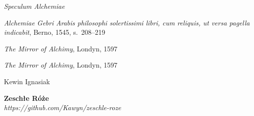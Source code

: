 \thispagestyle{empty}

\begin{flushleft}


\vspace{0.3em}

\textit{Speculum Alchemiae}

\vspace{1.5em}


\vspace{0.3em}


\textit{Alchemiae Gebri Arabis philosophi solertissimi libri, cum reliquis, ut versa pagella indicabit}, Berno, 1545, s.~208--219

\vspace{0.5em}

\textit{The Mirror of Alchimy}, Londyn, 1597

\vspace{1.5em}


\vspace{0.3em}

\textit{The Mirror of Alchimy}, Londyn, 1597

\vspace{1.5em}


\vspace{0.3em}

Kewin Ignasiak 

\vspace{1.5em}

\vfill 
\textbf{\footnotesize{Zeschłe Róże}}\\
\textit{\footnotesize{https://github.com/Kawyn/zeschle-roze}}

\vspace{1.15em}


\end{flushleft}

